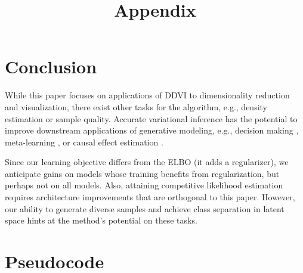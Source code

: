 \documentclass[letterpaper]{article} %
\begin{document}
\section{Conclusion}

While this paper focuses on applications of DDVI to dimensionality reduction and visualization, there exist other tasks for the algorithm, e.g., density estimation or sample quality. 
Accurate variational inference has the potential to improve downstream applications of generative modeling, e.g., decision making \citep{DBLP:conf/icml/NguyenG22,deshpande2023calibrated}, meta-learning \citep{rastogi2023semi}, or causal effect estimation \citep{deshpande2022deep}.

Since our learning objective differs from the ELBO (it adds a regularizer), we anticipate gains on models whose training benefits from regularization, but perhaps not on all models. Also, attaining competitive likelihood estimation requires architecture improvements that are orthogonal to this paper. However, our ability to generate diverse samples and achieve class separation in latent space hints at the method's potential on these tasks. 
% 



\newpage

\onecolumn

\title{Appendix}
\maketitle

\appendix
\section{Pseudocode}

\end{document}
